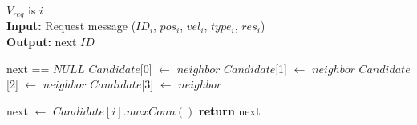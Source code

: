 \documentclass[sensors,article,accept,moreauthors,pdftex]{Definitions/mdpi}
\begin{document}
\begin{algorithm}[H]
    \caption{Inter-Resource Search} \label{algo.Inter}
    \textbf {$V_{req}$} is $i$\\
    \textbf{Input: } Request message ($ID_i$, $pos_i$, $vel_i$, $type_i$, $res_i$)\\
    \textbf{Output: } next $ID$\\
    \begin{algorithmic}[1]
    \State next == $NULL$
                \State $Candidate$[0] $\leftarrow$ $neighbor$
            \Else
                    \State $Candidate$[1] $\leftarrow$ $neighbor$
                \Else
                        \State $Candidate$[2] $\leftarrow$ $neighbor$
                    \Else
                        \State $Candidate$[3] $\leftarrow$ $neighbor$
                    \EndIf
                \EndIf
            \EndIf
        \EndIf
    \EndFor
        
            \State next $\leftarrow$ $Candidate[i].maxConn()$
            \State \textbf{return} next
        \EndIf
    \EndFor
    \end{algorithmic}
\end{algorithm}
\end{document}
